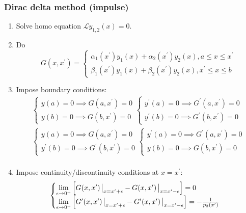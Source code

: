 \documentclass[8pt]{extarticle}
\newcommand{\Lh}{ {\mathcal{L}} }
\begin{document}
\begin{multicols*}{3}
\subsubsection{Dirac delta method (impulse)}
\begin{enumerate}
    \item Solve homo equation $\Lh y_{1,2}(x) = 0$.
    \item Do
        \begin{equation*}
            G(x,x^\prime) = \begin{cases}
                \alpha_1(x^\prime)y_1(x) + \alpha_2(x^\prime)y_2(x), a \leq x
                \leq x^\prime \\
                \beta_1(x^\prime)y_1(x) + \beta_2(x^\prime)y_2(x), x^\prime \leq
                x \leq b
            \end{cases}
        \end{equation*}
    \item Impose boundary conditions:
        \begin{gather*}
            \begin{cases}
                y(a) = 0 \implies G(a,x^\prime) = 0 \\
                y(b) = 0 \implies G(b,x^\prime) = 0
            \end{cases}
            \begin{cases}
                y^\prime(a) = 0 \implies G^\prime(a,x^\prime) = 0 \\
                y^\prime(b) = 0 \implies G^\prime(b,x^\prime) = 0
            \end{cases} \\
            \begin{cases}
                y(a) = 0 \implies G(a,x^\prime) = 0 \\
                y^\prime(b) = 0 \implies G^\prime(b,x^\prime) = 0
            \end{cases}
            \begin{cases}
                y^\prime(a) = 0 \implies G^\prime(a,x^\prime) = 0 \\
                y(b) = 0 \implies G(b,x^\prime) = 0
            \end{cases} \\
        \end{gather*}
    \item Impose continuity/discontinuity conditions at $x=x^\prime$:
         \begin{equation*}
            \begin{cases}
                \lim\limits_{\epsilon\to0^+} \qty[ G(x,x^\prime) \eval_{x=x^\prime +
                \epsilon} - G(x,x^\prime) \eval_{x=x^\prime - \epsilon}] = 0 \\
                \lim\limits_{\epsilon\to0^+} \qty[ G^\prime(x,x^\prime)
                \eval_{x=x^\prime + \epsilon} - G^\prime(x,x^\prime)
                \eval_{x=x^\prime - \epsilon}] = -\frac{1}{p_2(x^\prime)}
            \end{cases}
        \end{equation*}
\end{enumerate}

\end{multicols*}
\end{document}
